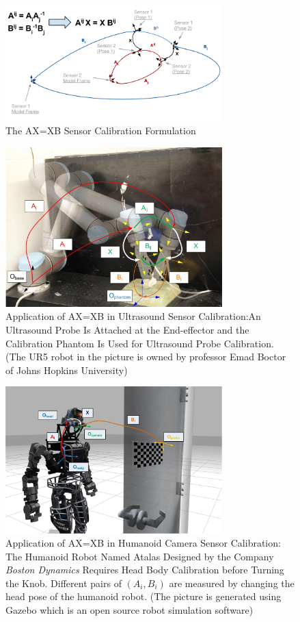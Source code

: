 \documentclass[twocolumn,10pt]{asme2ej}
\begin{document}
\begin{figure}[t]
\includegraphics[width=3.3in]{figure/AX=XB(ASME)_v1.png}
\centering
\caption{The AX=XB Sensor Calibration Formulation}
\label{AXXBfig1}
\end{figure}


\begin{figure}[t]
\centering
\includegraphics[width=3.3in]{Photos/UR5_Frame_Final.jpg}
\caption{Application of AX=XB in Ultrasound Sensor Calibration:An Ultrasound Probe Is Attached at the End-effector and the Calibration Phantom Is Used for Ultrasound Probe Calibration. (The UR5 robot in the picture is owned by professor Emad Boctor of Johns Hopkins University)}
\label{AXXBfig2}
\end{figure}

\begin{figure}[t]
\centering
\includegraphics[width=3.3in]{Photos/Robot_Patern.jpg}
\caption{Application of AX=XB in Humanoid Camera Sensor Calibration: The Humanoid Robot Named Atalas Designed by the Company \textit{Boston Dynamics} Requires Head Body Calibration before Turning the Knob. Different pairs of $(A_i, B_i)$ are measured by changing the head pose of the humanoid robot. (The picture is generated using Gazebo which is an open source robot simulation software)}
\label{AXXBfig3}
\end{figure}
\end{document}
